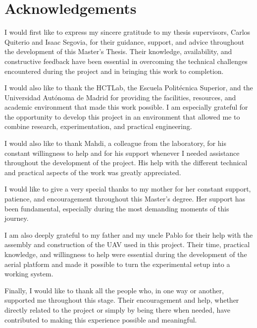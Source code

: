 \newpage
\chapter*{Acknowledgements}

I would first like to express my sincere gratitude to my thesis supervisors, Carlos Quiterio and Isaac Segovia, for their guidance, support, and advice throughout the development of this Master's Thesis. Their knowledge, availability, and constructive feedback have been essential in overcoming the technical challenges encountered during the project and in bringing this work to completion.

I would also like to thank the HCTLab, the Escuela Politécnica Superior, and the Universidad Autónoma de Madrid for providing the facilities, resources, and academic environment that made this work possible. I am especially grateful for the opportunity to develop this project in an environment that allowed me to combine research, experimentation, and practical engineering.

I would also like to thank Mahdi, a colleague from the laboratory, for his constant willingness to help and for his support whenever I needed assistance throughout the development of the project. His help with the different technical and practical aspects of the work was greatly appreciated.

I would like to give a very special thanks to my mother for her constant support, patience, and encouragement throughout this Master's degree. Her support has been fundamental, especially during the most demanding moments of this journey.

I am also deeply grateful to my father and my uncle Pablo for their help with the assembly and construction of the UAV used in this project. Their time, practical knowledge, and willingness to help were essential during the development of the aerial platform and made it possible to turn the experimental setup into a working system.

Finally, I would like to thank all the people who, in one way or another, supported me throughout this stage. Their encouragement and help, whether directly related to the project or simply by being there when needed, have contributed to making this experience possible and meaningful.
